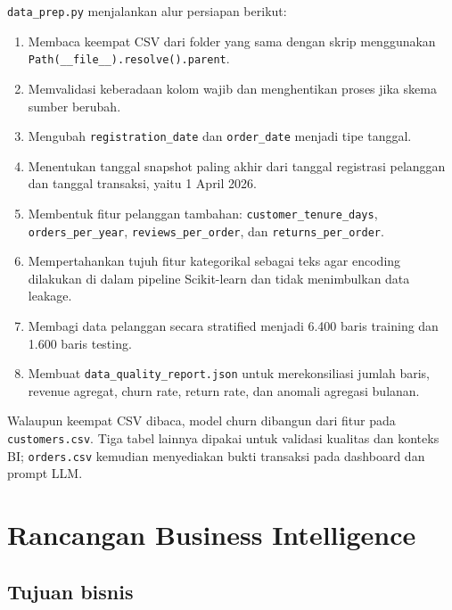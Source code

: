 \documentclass[
  indonesian,
  letterpaper,
  DIV=11,
  numbers=noendperiod]{scrreprt}
\providecommand{\tightlist}{%
  \setlength{\itemsep}{0pt}\setlength{\parskip}{0pt}}
\begin{document}

\texttt{data\_prep.py} menjalankan alur persiapan berikut:

\begin{enumerate}
\def\labelenumi{\arabic{enumi}.}
\tightlist
\item
  Membaca keempat CSV dari folder yang sama dengan skrip menggunakan
  \texttt{Path(\_\_file\_\_).resolve().parent}.
\item
  Memvalidasi keberadaan kolom wajib dan menghentikan proses jika skema
  sumber berubah.
\item
  Mengubah \texttt{registration\_date} dan \texttt{order\_date} menjadi
  tipe tanggal.
\item
  Menentukan tanggal snapshot paling akhir dari tanggal registrasi
  pelanggan dan tanggal transaksi, yaitu 1 April 2026.
\item
  Membentuk fitur pelanggan tambahan: \texttt{customer\_tenure\_days},
  \texttt{orders\_per\_year}, \texttt{reviews\_per\_order}, dan
  \texttt{returns\_per\_order}.
\item
  Mempertahankan tujuh fitur kategorikal sebagai teks agar encoding
  dilakukan di dalam pipeline Scikit-learn dan tidak menimbulkan data
  leakage.
\item
  Membagi data pelanggan secara stratified menjadi 6.400 baris training
  dan 1.600 baris testing.
\item
  Membuat \texttt{data\_quality\_report.json} untuk merekonsiliasi
  jumlah baris, revenue agregat, churn rate, return rate, dan anomali
  agregasi bulanan.
\end{enumerate}

Walaupun keempat CSV dibaca, model churn dibangun dari fitur pada
\texttt{customers.csv}. Tiga tabel lainnya dipakai untuk validasi
kualitas dan konteks BI; \texttt{orders.csv} kemudian menyediakan bukti
transaksi pada dashboard dan prompt LLM.

\section*{Rancangan Business
Intelligence}\label{rancangan-business-intelligence}


\subsection*{Tujuan bisnis}\label{tujuan-bisnis}
\end{document}

